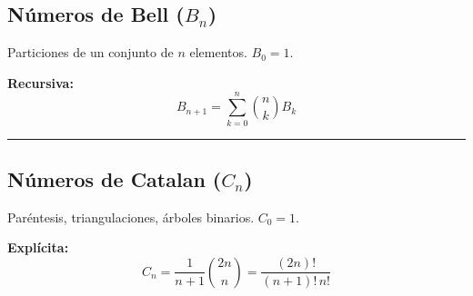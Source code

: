 
\subsection*{Números de Bell ($B_n$)}
Particiones de un conjunto de $n$ elementos. $B_0=1$.

\textbf{Recursiva:}
$$ B_{n+1} = \sum_{k=0}^{n} \binom{n}{k} B_k $$

\rule{\linewidth}{0.2pt}

\subsection*{Números de Catalan ($C_n$)}
Paréntesis, triangulaciones, árboles binarios. $C_0=1$.

\textbf{Explícita:}
$$ C_n = \frac{1}{n+1} \binom{2n}{n} = \frac{(2n)!}{(n+1)!\,n!} $$

